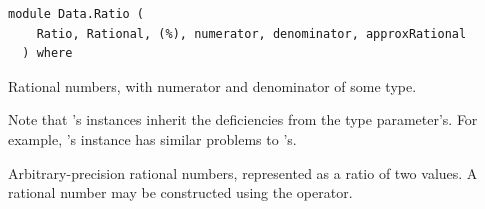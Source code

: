 \label{module:Data.Ratio}
\haddockbeginheader
{\haddockverb\begin{verbatim}
module Data.Ratio (
    Ratio, Rational, (%), numerator, denominator, approxRational
  ) where\end{verbatim}}
\haddockendheader

\begin{haddockdesc}
\item[\begin{tabular}{@{}l}
data Ratio a
\end{tabular}]
{\haddockbegindoc
Rational numbers, with numerator and denominator of some  type.\par
Note that 's instances inherit the deficiencies from the type
 parameter's. For example, 's  instance has similar
 problems to 's.\par}
\end{haddockdesc}
\begin{haddockdesc}
\item[\begin{tabular}{@{}l}
instance Integral a => Enum Ratio a\\instance (Storable a, Integral a) => Storable Ratio a\\instance Integral a => Num Ratio a\\instance (Integral a, Read a) => Read Ratio a\\instance Integral a => Fractional Ratio a\\instance Integral a => Real Ratio a\\instance Integral a => RealFrac Ratio a\\instance Show a => Show Ratio a\\instance Eq a => Eq Ratio a\\instance Integral a => Ord Ratio a
\end{tabular}]
\end{haddockdesc}
\begin{haddockdesc}
\item[\begin{tabular}{@{}l}
type Rational = Ratio Integer
\end{tabular}]
{\haddockbegindoc
Arbitrary-precision rational numbers, represented as a ratio of
 two  values.  A rational number may be constructed using
 the  operator.\par}
\end{haddockdesc}
